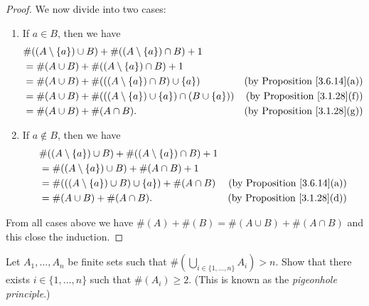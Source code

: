 \begin{proof}
    We now divide into two cases:
    \begin{enumerate}
        \item If \(a \in B\), then we have
              \begin{align*}
                   & \#((A \setminus \{a\}) \cup B) + \#((A \setminus \{a\}) \cap B) + 1                                                 \\
                   & = \#(A \cup B) + \#((A \setminus \{a\}) \cap B) + 1                                                                 \\
                   & = \#(A \cup B) + \#(((A \setminus \{a\}) \cap B) \cup \{a\})              & \text{(by Proposition \ref{3.6.14}(a))} \\
                   & = \#(A \cup B) + \#(((A \setminus \{a\}) \cup \{a\}) \cap (B \cup \{a\})) & \text{(by Proposition \ref{3.1.28}(f))} \\
                   & = \#(A \cup B) + \#(A \cap B).                                            & \text{(by Proposition \ref{3.1.28}(g))}
              \end{align*}
        \item If \(a \notin B\), then we have
              \begin{align*}
                   & \#((A \setminus \{a\}) \cup B) + \#((A \setminus \{a\}) \cap B) + 1                                           \\
                   & = \#((A \setminus \{a\}) \cup B) + \#(A \cap B) + 1                                                           \\
                   & = \#(((A \setminus \{a\}) \cup B) \cup \{a\}) + \#(A \cap B)        & \text{(by Proposition \ref{3.6.14}(a))} \\
                   & = \#(A \cup B) + \#(A \cap B).                                      & \text{(by Proposition \ref{3.1.28}(d))}
              \end{align*}
    \end{enumerate}
    From all cases above we have \(\#(A) + \#(B) = \#(A \cup B) + \#(A \cap B)\) and this close the induction.
\end{proof}

\begin{exercise}\label{ex 3.6.10}
    Let \(A_1, \dots, A_n\) be finite sets such that \(\#(\bigcup_{i \in \{1, \dots, n\}} A_i) > n\).
    Show that there exists \(i \in \{1, \dots, n\}\) such that \(\#(A_i) \geq 2\).
    (This is known as the \emph{pigeonhole principle}.)
\end{exercise}

